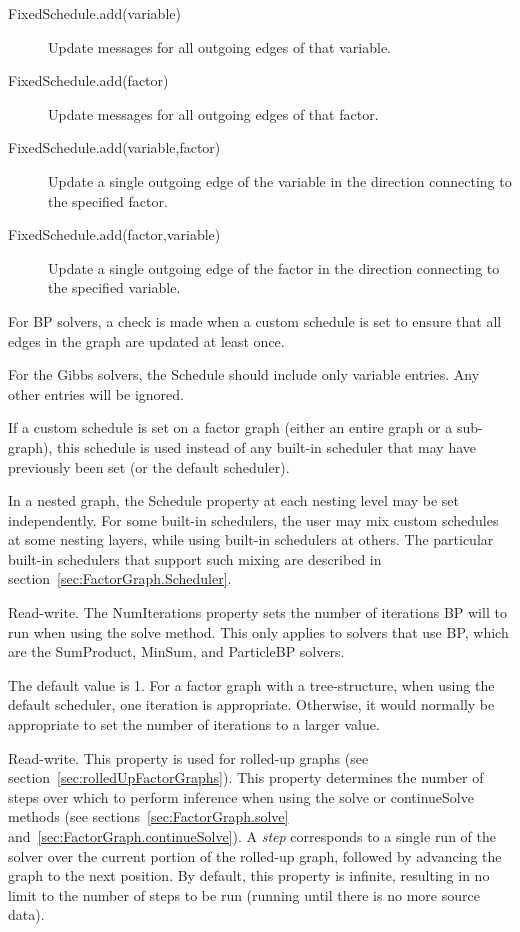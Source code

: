 \ifjava
\begin{description}
\item[FixedSchedule.add(variable)] Update messages for all outgoing edges of that variable.
\item[FixedSchedule.add(factor)] Update messages for all outgoing edges of that factor.
\item[FixedSchedule.add(variable,factor)] Update a single outgoing edge of the variable in the direction connecting to the specified factor.
\item[FixedSchedule.add(factor,variable)] Update a single outgoing edge of the factor in the direction connecting to the specified variable.
\end{description}
\fi

For BP solvers, a check is made when a custom schedule is set to ensure that all edges in the graph are updated at least once.

For the Gibbs solvers, the Schedule should include only variable entries.  Any other entries will be ignored.

If a custom schedule is set on a factor graph (either an entire graph or a sub-graph), this schedule is used instead of any built-in scheduler that may have previously been set (or the default scheduler).

In a nested graph, the Schedule property at each nesting level may be set independently.  For some built-in schedulers, the user may mix custom schedules at some nesting layers, while using built-in schedulers at others.  The particular built-in schedulers that support such mixing are described in section~\ref{sec:FactorGraph.Scheduler}.



Read-write.  The NumIterations property sets the number of iterations BP will to run when using the solve method.  This only applies to solvers that use BP, which are the SumProduct, MinSum, and ParticleBP solvers.

The default value is 1.  For a factor graph with a tree-structure, when using the default scheduler, one iteration is appropriate.  Otherwise, it would normally be appropriate to set the number of iterations to a larger value.


Read-write.  This property is used for rolled-up graphs (see section~\ref{sec:rolledUpFactorGraphs}).  This property determines the number of steps over which to perform inference when using the solve or continueSolve methods (see sections~\ref{sec:FactorGraph.solve} and~\ref{sec:FactorGraph.continueSolve}).  A \emph{step} corresponds to a single run of the solver over the current portion of the rolled-up graph, followed by advancing the graph to the next position.  By default, this property is infinite, resulting in no limit to the number of steps to be run (running until there is no more source data).

